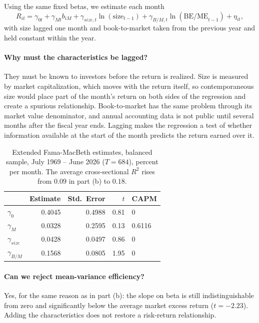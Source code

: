 Using the same fixed betas, we estimate each month
\[
R_{it} = \gamma_{0t} + \gamma_{Mt} b_{iM}
+ \gamma_{size,t}\ln(\text{size}_{t-1})
+ \gamma_{B/M,t}\ln(\text{BE/ME}_{t-1}) + \eta_{it},
\]
with size lagged one month and book-to-market taken from the previous year and
held constant within the year.

\paragraph{Why must the characteristics be lagged?} They must be known to
investors before the return is realized. Size is measured by market
capitalization, which moves with the return itself, so contemporaneous size
would place part of the month's return on both sides of the regression and
create a spurious relationship. Book-to-market has the same problem through its
market value denominator, and annual accounting data is not public until
several months after the fiscal year ends. Lagging makes the regression a test
of whether information available at the start of the month predicts the return
earned over it.

\begin{table}[H]
\centering
\caption{Extended Fama-MacBeth estimates, balanced sample, July 1969 -- June
2026 ($T = 684$), percent per month. The average cross-sectional $R^2$ rises
from $0.09$ in part (b) to $0.18$.}
\small
\begin{tabular}{lrrrl}
\toprule
& Estimate & Std.\ Error & $t$ & CAPM \\
\midrule
$\gamma_0$        & 0.4045 & 0.4988 & 0.81 & 0 \\
$\gamma_M$        & 0.0328 & 0.2595 & 0.13 & 0.6116 \\
$\gamma_{size}$   & 0.0428 & 0.0497 & 0.86 & 0 \\
$\gamma_{B/M}$    & 0.1568 & 0.0805 & 1.95 & 0 \\
\bottomrule
\end{tabular}
\label{tab:fmbext}
\end{table}

\paragraph{Can we reject mean-variance efficiency?} Yes, for the same reason as
in part (b): the slope on beta is still indistinguishable from zero and
significantly below the average market excess return ($t = -2.23$). Adding the
characteristics does not restore a risk-return relationship.

